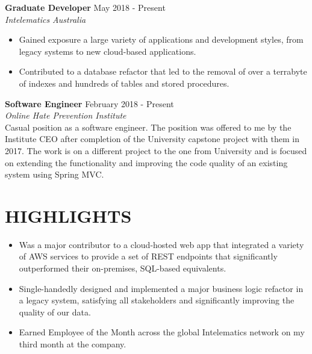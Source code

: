 \documentclass[margin, 11pt]{res} %
\begin{document}
\begin{resume}
\textbf{Graduate Developer} \hfill May 2018 - Present \\
{\sl Intelematics Australia} \\
\begin{itemize}

\item Gained exposure a large variety of applications and development styles, from legacy systems to new cloud-based applications.
\item Contributed to a database refactor that led to the removal of over a terrabyte of indexes and hundreds of tables and stored procedures.

\end{itemize} 

\textbf{Software Engineer} \hfill February 2018 - Present \\
{\sl Online Hate Prevention Institute} \\
Casual position as a software engineer. The position was offered to me by the Institute CEO after completion of the University capstone project with them in 2017. The work is on a different project to the one from University and is focused on extending the functionality and improving the code quality of an existing system using Spring MVC.


\section{HIGHLIGHTS} 

\begin{itemize}

\item Was a major contributor to a cloud-hosted web app that integrated a variety of AWS services to provide a set of REST endpoints that significantly outperformed their on-premises, SQL-based equivalents.
\item Single-handedly designed and implemented a major business logic refactor in a legacy system, satisfying all stakeholders and significantly improving the quality of our data.
\item Earned Employee of the Month across the global Intelematics network on my third month at the company.



\end{itemize}
\end{resume}
\end{document}
